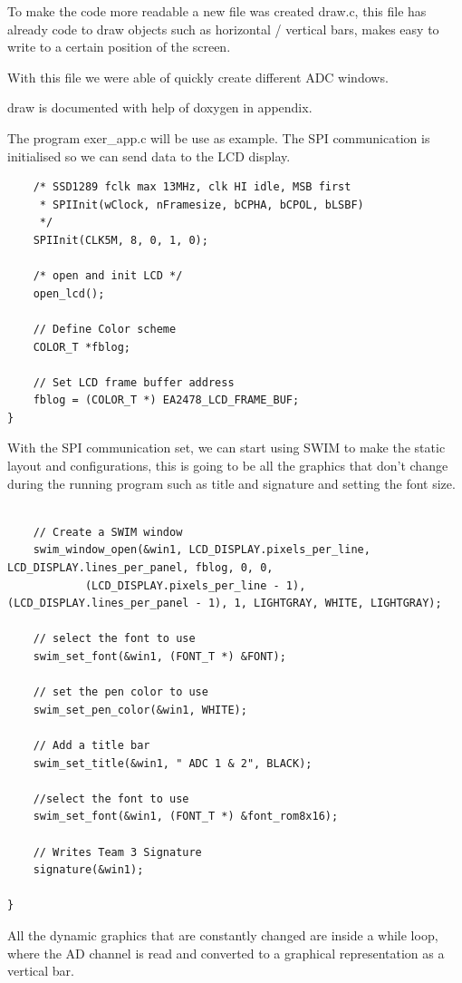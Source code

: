 To make the code more readable a new file was created draw.c, this file has already code to draw objects such as horizontal / vertical bars, makes easy to write to a certain position of the screen.

With this file we were able of quickly create different ADC windows.

draw is documented with help of doxygen in appendix.

The program exer\_app.c will be use as example.
The SPI communication is initialised so we can send data to the LCD display.

\begin{lstlisting}
	/* SSD1289 fclk max 13MHz, clk HI idle, MSB first
	 * SPIInit(wClock, nFramesize, bCPHA, bCPOL, bLSBF)
	 */
	SPIInit(CLK5M, 8, 0, 1, 0);

	/* open and init LCD */
	open_lcd();

	// Define Color scheme
	COLOR_T *fblog;

	// Set LCD frame buffer address
	fblog = (COLOR_T *) EA2478_LCD_FRAME_BUF;
}

\end{lstlisting}

With the SPI communication set, we can start using SWIM to make the static layout and configurations, this is going to be all the graphics that don't change during the running program such as title and signature and setting the font size.

\begin{lstlisting}

	// Create a SWIM window
	swim_window_open(&win1, LCD_DISPLAY.pixels_per_line, LCD_DISPLAY.lines_per_panel, fblog, 0, 0,
			(LCD_DISPLAY.pixels_per_line - 1), (LCD_DISPLAY.lines_per_panel - 1), 1, LIGHTGRAY, WHITE, LIGHTGRAY);

	// select the font to use
	swim_set_font(&win1, (FONT_T *) &FONT);

	// set the pen color to use
	swim_set_pen_color(&win1, WHITE);

	// Add a title bar
	swim_set_title(&win1, " ADC 1 & 2", BLACK);

	//select the font to use
	swim_set_font(&win1, (FONT_T *) &font_rom8x16);

	// Writes Team 3 Signature
	signature(&win1);

}

\end{lstlisting}
 
All the dynamic graphics that are constantly changed are inside a while loop, where the AD channel is read and converted to a graphical representation as a vertical bar.

